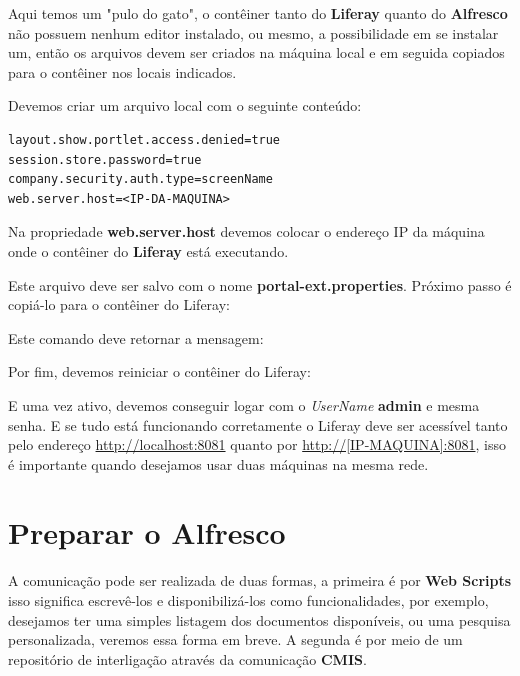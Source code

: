 \documentclass[a4paper,11pt]{article}
\begin{document}
Aqui temos um "pulo do gato", o contêiner tanto do \textbf{Liferay} quanto do \textbf{Alfresco} não possuem nenhum editor instalado, ou mesmo, a possibilidade em se instalar um, então os arquivos devem ser criados na máquina local e em seguida copiados para o contêiner nos locais indicados.

Devemos criar um arquivo local com o seguinte conteúdo:
\begin{lstlisting}
layout.show.portlet.access.denied=true
session.store.password=true
company.security.auth.type=screenName
web.server.host=<IP-DA-MAQUINA>
\end{lstlisting}

Na propriedade \textbf{web.server.host} devemos colocar o endereço IP da máquina onde o contêiner do \textbf{Liferay} está executando.

Este arquivo deve ser salvo com o nome \textbf{portal-ext.properties}. Próximo passo é copiá-lo para o contêiner do Liferay: \\

Este comando deve retornar a mensagem: \\

Por fim, devemos reiniciar o contêiner do Liferay: \\

E uma vez ativo, devemos conseguir logar com o \textit{UserName} \textbf{admin} e mesma senha. E se tudo está funcionando corretamente o Liferay deve ser acessível tanto pelo endereço \url{http://localhost:8081} quanto por \url{http://[IP-MAQUINA]:8081}, isso é importante quando desejamos usar duas máquinas na mesma rede.

\section{Preparar o Alfresco}
A comunicação pode ser realizada de duas formas, a primeira é por \textbf{Web Scripts} isso significa escrevê-los e disponibilizá-los como funcionalidades, por exemplo, desejamos ter uma simples listagem dos documentos disponíveis, ou uma pesquisa personalizada, veremos essa forma em breve. A segunda é por meio de um repositório de interligação através da comunicação \textbf{CMIS}.
\end{document}
